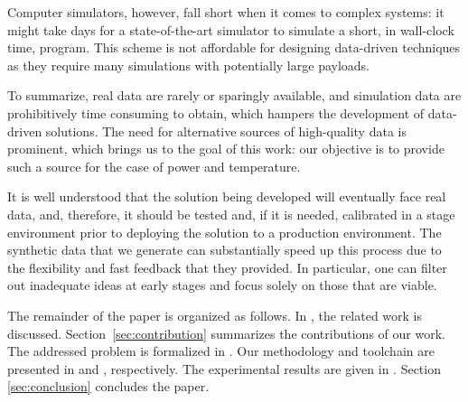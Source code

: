 Computer simulators, however, fall short when it comes to complex systems: it
might take days for a state-of-the-art simulator to simulate a short, in
wall-clock time, program. This scheme is not affordable for designing
data-driven techniques as they require many simulations with potentially large
payloads.

To summarize, real data are rarely or sparingly available, and simulation data
are prohibitively time consuming to obtain, which hampers the development of
data-driven solutions. The need for alternative sources of high-quality data is
prominent, which brings us to the goal of this work: our objective is to provide
such a source for the case of power and temperature.

It is well understood that the solution being developed will eventually face
real data, and, therefore, it should be tested and, if it is needed, calibrated
in a stage environment prior to deploying the solution to a production
environment. The synthetic data that we generate can substantially speed up this
process due to the flexibility and fast feedback that they provided. In
particular, one can filter out inadequate ideas at early stages and focus solely
on those that are viable.

The remainder of the paper is organized as follows. In , the
related work is discussed. Section~\ref{sec:contribution} summarizes the
contributions of our work. The addressed problem is formalized in
. Our methodology and toolchain are presented in
 and , respectively. The experimental results
are given in . Section \ref{sec:conclusion} concludes the paper.

